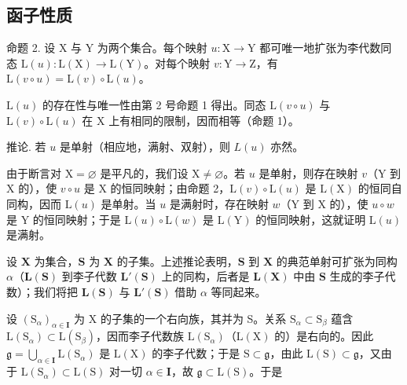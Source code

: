 \subsection{函子性质}

命题 2. 设 X 与 Y 为两个集合。每个映射 \(u: \mathrm{X} \to \mathrm{Y}\) 都可唯一地扩张为李代数同态 \(\mathrm{L}(u): \mathrm{L}(\mathrm{X}) \to \mathrm{L}(\mathrm{Y})\)。对每个映射 \(v: \mathrm{Y} \to \mathrm{Z}\)，有 \(\mathrm{L}(v \circ u) = \mathrm{L}(v) \circ \mathrm{L}(u)\)。

\(\mathrm{L}(u)\) 的存在性与唯一性由第 2 号命题 1 得出。同态 \(\mathrm{L}(v\circ u)\) 与 \(\mathrm{L}(v)\circ \mathrm{L}(u)\) 在 X 上有相同的限制，因而相等（命题 1）。

推论. 若 \(u\) 是单射（相应地，满射、双射），则 \(L(u)\) 亦然。

由于断言对 \(\mathrm{X} = \varnothing\) 是平凡的，我们设 \(\mathrm{X} \neq \varnothing\)。若 \(u\) 是单射，则存在映射 \(v\)（\(\mathrm{Y}\) 到 \(\mathrm{X}\) 的），使 \(v \circ u\) 是 \(\mathrm{X}\) 的恒同映射；由命题 2，\(\mathrm{L}(v) \circ \mathrm{L}(u)\) 是 \(\mathrm{L}(\mathrm{X})\) 的恒同自同构，因而 \(\mathrm{L}(u)\) 是单射。当 \(u\) 是满射时，存在映射 \(w\)（\(\mathrm{Y}\) 到 \(\mathrm{X}\) 的），使 \(u \circ w\) 是 \(\mathrm{Y}\) 的恒同映射；于是 \(\mathrm{L}(u) \circ \mathrm{L}(w)\) 是 \(\mathrm{L}(\mathrm{Y})\) 的恒同映射，这就证明 \(\mathrm{L}(u)\) 是满射。

设 \(\mathbf{X}\) 为集合，\(\mathbf{S}\) 为 \(\mathbf{X}\) 的子集。上述推论表明，\(\mathbf{S}\) 到 \(\mathbf{X}\) 的典范单射可扩张为同构 \(\alpha\)（\(\mathbf{L}(\mathbf{S})\) 到李子代数 \(\mathbf{L}'(\mathbf{S})\) 上的同构，后者是 \(\mathbf{L}(\mathbf{X})\) 中由 \(\mathbf{S}\) 生成的李子代数）；我们将把 \(\mathbf{L}(\mathbf{S})\) 与 \(\mathbf{L}'(\mathbf{S})\) 借助 \(\alpha\) 等同起来。

设 \((\mathrm{S}_{\alpha})_{\alpha \in \mathbf{I}}\) 为 X 的子集的一个右向族，其并为 S。关系 \(\mathrm{S}_{\alpha} \subset \mathrm{S}_{\beta}\) 蕴含 \(\mathrm{L}(\mathrm{S}_{\alpha}) \subset \mathrm{L}(\mathrm{S}_{\beta})\)，因而李子代数族 \(\mathrm{L}(\mathrm{S}_{\alpha})\)（\(\mathrm{L}(\mathrm{X})\) 的）是右向的。因此 \(\mathfrak{g} = \bigcup_{\alpha \in \mathbf{I}} \mathrm{L}(\mathrm{S}_{\alpha})\) 是 \(\mathrm{L}(\mathrm{X})\) 的李子代数；于是 \(\mathrm{S} \subset \mathfrak{g}\)，由此 \(\mathrm{L}(\mathrm{S}) \subset \mathfrak{g}\)，又由于 \(\mathrm{L}(\mathrm{S}_{\alpha}) \subset \mathrm{L}(\mathrm{S})\) 对一切 \(\alpha \in \mathbf{I}\)，故 \(\mathfrak{g} \subset \mathrm{L}(\mathrm{S})\)。于是

